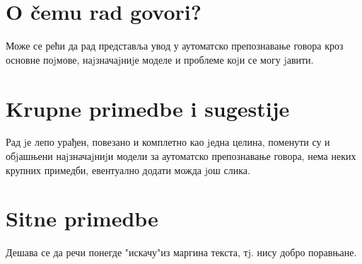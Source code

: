 \documentclass[a4paper]{report}
\begin{document}
\section{O čemu rad govori?}
Може се рећи да рад представља увод у аутоматско препознавање говора кроз основне поjмове, наjзначаjниjе моделе и проблеме коjи се могу jавити.

\section{Krupne primedbe i sugestije}
Рад jе лепо урађен, повезано и комплетно као jедна целина, поменути су и обjашњени наjзначаjниjи модели за аутоматско препознавање говора, нема неких крупних примедби, евентуално додати можда jош слика.

\section{Sitne primedbe}
Дешава се да речи понегде "искачу"из маргина текста, тj. нису добро поравњане.
\end{document}
